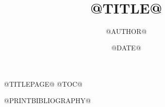 \documentclass[@PAPER@paper,@SIZE@pt]{article}
\title{@TITLE@}
\author{@AUTHOR@}
\date{@DATE@}
\begin{document}
\MarkTwoTeXBody\MarkTwoTeXMathSpacing
@TITLEPAGE@
@TOC@

@PRINTBIBLIOGRAPHY@
\end{document}
